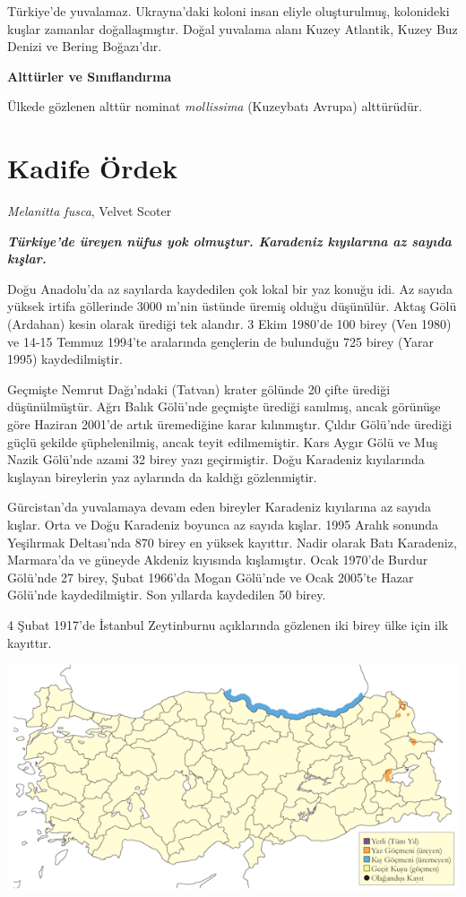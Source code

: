 \documentclass[
  letterpaper,
  DIV=11,
  numbers=noendperiod]{scrreprt}
\begin{document}
Türkiye'de yuvalamaz. Ukrayna'daki koloni insan eliyle oluşturulmuş,
kolonideki kuşlar zamanlar doğallaşmıştır. Doğal yuvalama alanı Kuzey
Atlantik, Kuzey Buz Denizi ve Bering Boğazı'dır.

\textbf{Alttürler ve Sınıflandırma}

Ülkede gözlenen alttür nominat \emph{mollissima} (Kuzeybatı Avrupa)
alttürüdür.

\section{Kadife Ördek}\label{kadife-uxf6rdek}

\emph{Melanitta fusca}, Velvet Scoter

\textbf{\emph{Türkiye'de üreyen nüfus yok olmuştur. Karadeniz kıyılarına
az sayıda kışlar.}}

Doğu Anadolu'da az sayılarda kaydedilen çok lokal bir yaz konuğu idi. Az
sayıda yüksek irtifa göllerinde 3000 m'nin üstünde üremiş olduğu
düşünülür. Aktaş Gölü (Ardahan) kesin olarak ürediği tek alandır. 3 Ekim
1980'de 100 birey (Ven 1980) ve 14-15 Temmuz 1994'te aralarında
gençlerin de bulunduğu 725 birey (Yarar 1995) kaydedilmiştir.

Geçmişte Nemrut Dağı'ndaki (Tatvan) krater gölünde 20 çifte ürediği
düşünülmüştür. Ağrı Balık Gölü'nde geçmişte ürediği sanılmış, ancak
görünüşe göre Haziran 2001'de artık üremediğine karar kılınmıştır.
Çıldır Gölü'nde ürediği güçlü şekilde şüphelenilmiş, ancak teyit
edilmemiştir. Kars Aygır Gölü ve Muş Nazik Gölü'nde azami 32 birey yazı
geçirmiştir. Doğu Karadeniz kıyılarında kışlayan bireylerin yaz
aylarında da kaldığı gözlenmiştir.

Gürcistan'da yuvalamaya devam eden bireyler Karadeniz kıyılarına az
sayıda kışlar. Orta ve Doğu Karadeniz boyunca az sayıda kışlar. 1995
Aralık sonunda Yeşilırmak Deltası'nda 870 birey en yüksek kayıttır.
Nadir olarak Batı Karadeniz, Marmara'da ve güneyde Akdeniz kıyısında
kışlamıştır. Ocak 1970'de Burdur Gölü'nde 27 birey, Şubat 1966'da Mogan
Gölü'nde ve Ocak 2005'te Hazar Gölü'nde kaydedilmiştir. Son yıllarda
kaydedilen 50 birey.

4 Şubat 1917'de İstanbul Zeytinburnu açıklarında gözlenen iki birey ülke
için ilk kayıttır.

\includegraphics{images/harita_Page_028.png}
\end{document}
